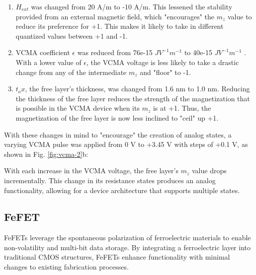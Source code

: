 \documentclass[conference]{IEEEtran}
\begin{document}
\begin{enumerate}
    \item $H_{ext}$ was changed from 20 A/m to -10 A/m. This lessened the stability provided from an external magnetic field, which "encourages" the $m_z$ value to reduce its preference for +1. This makes it likely to take in different quantized values between +1 and -1.
    \item VCMA coefficient $\epsilon$ was reduced from 76e-15 $JV^{-1}m^{-1}$ to 40e-15 $JV^{-1}m^{-1}$ . With a lower value of $\epsilon$, the VCMA voltage is less likely to take a drastic change from any of the intermediate $m_z$ and "floor" to -1.
    \item ${t_ox}$, the free layer's thickness, was changed from 1.6 nm to 1.0 nm. Reducing the thickness of the free layer reduces the strength of the magnetization that is possible in the VCMA device when its $m_z$ is at +1. Thus, the magnetization of the free layer is now less inclined to "ceil" up +1.
\end{enumerate}

With these changes in mind to "encourage" the creation of analog states, a varying VCMA pulse was applied from 0 V to +3.45 V with steps of +0.1 V, as shown in Fig. \ref{fig:vcma-2}b:

With each increase in the VCMA voltage, the free layer's $m_z$ value drops incrementally. This change in its resistance states produces an analog functionality, allowing for a device architecture that supports multiple states.


\subsection{FeFET}
FeFETs leverage the spontaneous polarization of ferroelectric materials to enable non-volatility and multi-bit data storage. By integrating a ferroelectric layer into traditional CMOS structures, FeFETs enhance functionality with minimal changes to existing fabrication processes. 
\end{document}
